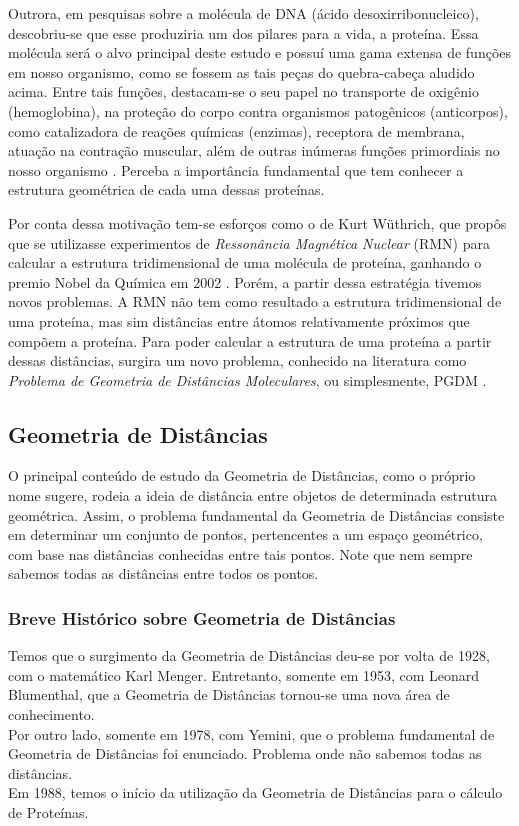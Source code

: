 \documentclass[a4paper,12pt]{article}
\begin{document}
	Outrora, em pesquisas sobre a molécula de DNA (ácido desoxirribonucleico), descobriu-se que esse produziria um dos pilares para a vida, a proteína. Essa molécula será o alvo principal deste estudo e possuí uma gama extensa de funções em nosso organismo, como se fossem as tais peças do quebra-cabeça aludido acima. Entre tais funções, destacam-se o seu papel no transporte de oxigênio (hemoglobina), na proteção do corpo contra organismos patogênicos (anticorpos), como catalizadora de reações químicas (enzimas), receptora de membrana, atuação na contração muscular, além de outras inúmeras funções primordiais no nosso organismo \cite{fidalgotese}. Perceba a importância fundamental que tem conhecer a estrutura geométrica de cada uma dessas proteínas.
	
	Por conta dessa motivação tem-se esforços como o de Kurt Wüthrich, que propôs que se utilizasse experimentos de \textit{Ressonância Magnética Nuclear}
	(RMN) para calcular a estrutura tridimensional de uma molécula de proteína, ganhando o premio Nobel da Química em 2002 \cite{RMNproteinWrutrich}. Porém, a partir dessa estratégia tivemos novos problemas. A RMN não tem como resultado a estrutura tridimensional de uma proteína, mas sim distâncias entre átomos relativamente próximos que compõem a proteína. Para poder calcular a estrutura de uma proteína a partir dessas distâncias, surgira um novo problema, conhecido na literatura como \textit{Problema de Geometria de Distâncias Moleculares}, ou simplesmente, PGDM \cite{carlileGDandAplications}.
	
	\subsection{Geometria de Distâncias}
	O principal conteúdo de estudo da Geometria de Distâncias, como o próprio nome sugere, rodeia a ideia de distância entre objetos de determinada estrutura geométrica. Assim, o problema fundamental da Geometria de Distâncias consiste em determinar um conjunto de pontos, pertencentes a um espaço geométrico, com base nas distâncias conhecidas entre tais pontos. Note que nem sempre sabemos todas as distâncias entre todos os pontos.
	\subsubsection*{Breve Histórico sobre Geometria de Distâncias}
	Temos que o surgimento da Geometria de Distâncias deu-se por volta de 1928, com o matemático Karl Menger. Entretanto, somente em 1953, com Leonard Blumenthal, que a Geometria de Distâncias tornou-se uma nova área de conhecimento.
	\\
	Por outro lado, somente em 1978, com Yemini, que o problema fundamental de Geometria de Distâncias foi enunciado. Problema onde não sabemos todas as distâncias.
	\\
	Em 1988, temos o início da utilização da Geometria de Distâncias para o cálculo de Proteínas.
	
\end{document}
